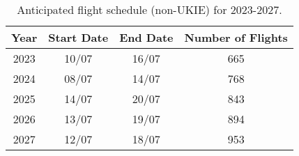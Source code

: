 
\begin{table}[ht]
\centering
\begin{tabular}{cccc}
  \hline
{\textbf{Year}} & {\textbf{Start Date}} & {\textbf{End Date}} & {\textbf{Number of Flights}} \\ 
  \hline
2023 & 10/07 & 16/07 & 665 \\ 
  2024 & 08/07 & 14/07 & 768 \\ 
  2025 & 14/07 & 20/07 & 843 \\ 
  2026 & 13/07 & 19/07 & 894 \\ 
  2027 & 12/07 & 18/07 & 953 \\ 
   \hline
\end{tabular}
\caption{Anticipated flight schedule (non-UKIE) for 2023-2027. \label{tab:anticipated_schedule}} 
\end{table}
